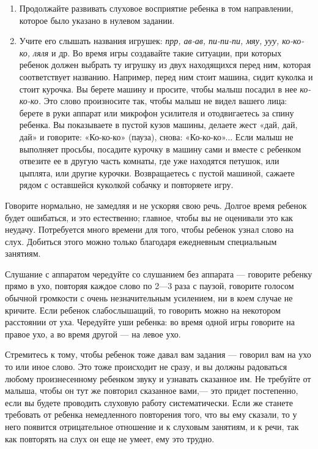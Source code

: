 \documentclass{book}
\renewcommand{\emph}[1]{\textit{#1}}
\begin{document}
\begin{enumerate}
\def\labelenumi{\arabic{enumi}.}
\item
  
  Продолжайте развивать слуховое восприятие ребенка в том направлении,
  которое было указано в нулевом задании.
  
\item
  
  Учите его слышать названия игрушек: \emph{прр, ав-ав, пи-пи-пи, мяу,
  ууу, ко-ко-ко, ляля} и др. Во время игры создавайте такие ситуации,
  при которых ребенок должен выбрать ту игрушку из двух находящихся
  перед ним, которая соответствует названию. Например, перед ним стоит
  машина, сидит куколка и стоит курочка. Вы берете машину и просите,
  чтобы малыш посадил в нее \emph{ко-ко-ко.} Это слово произносите так,
  чтобы малыш не видел вашего лица: берете в руки аппарат или микрофон
  усилителя и отодвигаетесь за спину ребенка. Вы показываете в пустой
  кузов машины, делаете жест «дай, дай, дай» и говорите: «Ко-ко-ко»
  (пауза), снова: «Ко-ко-ко»... Если малыш не выполняет просьбы,
  посадите курочку в машину сами и вместе с ребенком отвезите ее в
  другую часть комнаты, где уже находятся петушок, или цыплята, или
  другие курочки. Возвращаетесь с пустой машиной, сажаете рядом с
  оставшейся куколкой собачку и повторяете игру.
  
\end{enumerate}


Говорите нормально, не замедляя и не ускоряя свою речь. Долгое время
ребенок будет ошибаться, и это естественно; главное, чтобы вы не
оценивали это как неудачу. Потребуется много времени для того, чтобы
ребенок узнал слово на слух. Добиться этого можно только благодаря
ежедневным специальным занятиям.

Слушание с аппаратом чередуйте со слушанием без аппарата --- говорите
ребенку прямо в ухо, повторяя каждое слово по 2---3 раза с паузой,
говорите голосом обычной громкости с очень незначительным усилением, ни
в коем случае не кричите. Если ребенок слабослышащий, то говорить можно
на некотором расстоянии от уха. Чередуйте уши ребенка: во время одной
игры говорите на правое ухо, а во время другой --- на левое ухо.

Стремитесь к тому, чтобы ребенок тоже давал вам задания --- говорил вам
на ухо то или иное слово. Это тоже происходит не сразу, и вы должны
радоваться любому произнесенному ребенком звуку и узнавать сказанное им.
Не требуйте от малыша, чтобы он тут же повторил сказанное вами,--- это
придет постепенно, если вы будете проводить слуховую работу
систематически. Если же станете требовать от ребенка немедленного
повторения того, что вы ему сказали, то у него появится отрицательное
отношение и к слуховым занятиям, и к речи, так как повторять на слух он
еще не умеет, ему это трудно.
\end{document}
